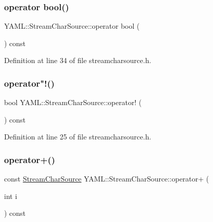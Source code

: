 \subsubsection{\texorpdfstring{operator bool()}{operator bool()}}
{\footnotesize\ttfamily Y\+A\+M\+L\+::\+Stream\+Char\+Source\+::operator bool (\begin{DoxyParamCaption}{ }\end{DoxyParamCaption}) const\hspace{0.3cm}{\ttfamily [inline]}}



Definition at line 34 of file streamcharsource.\+h.

\mbox{\label{class_y_a_m_l_1_1_stream_char_source_a93e8c769996d96674b28de55524f4a88}} 
\subsubsection{\texorpdfstring{operator"!()}{operator!()}}
{\footnotesize\ttfamily bool Y\+A\+M\+L\+::\+Stream\+Char\+Source\+::operator! (\begin{DoxyParamCaption}{ }\end{DoxyParamCaption}) const\hspace{0.3cm}{\ttfamily [inline]}}



Definition at line 25 of file streamcharsource.\+h.

\mbox{\label{class_y_a_m_l_1_1_stream_char_source_a42bdd08d14c08f5fec190216b1c91e27}} 
\subsubsection{\texorpdfstring{operator+()}{operator+()}}
{\footnotesize\ttfamily const \mbox{\hyperlink{class_y_a_m_l_1_1_stream_char_source}{Stream\+Char\+Source}} Y\+A\+M\+L\+::\+Stream\+Char\+Source\+::operator+ (\begin{DoxyParamCaption}\item[{int}]{i }\end{DoxyParamCaption}) const\hspace{0.3cm}{\ttfamily [inline]}}



